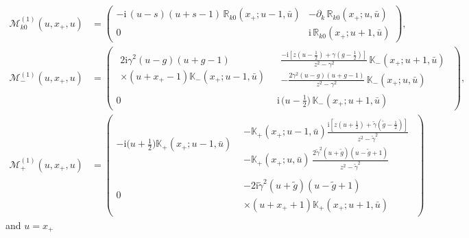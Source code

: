 \documentclass[a4paper,11pt]{article}
\renewcommand{\imath}{\mathrm{i}}
\numberwithin{equation}{section}
\begin{document}
\begin{align}
	\label{Mk01}
	\mathcal{M}^{(1)}_{k0}(u,x_+,u) & =
	\begin{pmatrix}
		-\imath\,(u-s)(u+s-1)\,\mathbb{R}_{k0}(x_+;u-1,\bar{u}) &
		-\partial_k\,\mathbb{R}_{k0}(x_+;u,\bar{u}) \\
		0 & \imath\,\mathbb{R}_{k0}(x_+;u+1,\bar{u})
	\end{pmatrix} , \\
	\label{M-1}
	\mathcal{M}^{(1)}_-(u,x_+,u) & =
	\left(
	\begin{array}{c|c}
		\begin{array}{l}
			2\imath\gamma^2(u-g)(u+g-1) \\
			\times (u+x_+-1)\mathbb{K}_-(x_+;u-1,\bar{u})
		\end{array} &
		\begin{array}{l}
			\frac{-\imath[z(u-\frac{1}{2})+\gamma(g-\frac{1}{2})]}{z^2-\gamma^2}\,\mathbb{K}_-(x_+;u+1,\bar{u}) \\
			-\frac{2\gamma^2(u-g)(u+g-1)}{z^2-\gamma^2}\,\mathbb{K}_-(x_+;u,\bar{u})
		\end{array} \\[12pt]
		\hline
		0 & \imath\,\bigl(u-\frac{1}{2}\bigr)\,\mathbb{K}_-(x_+;u+1,\bar{u})
	\end{array}
	\right) \!, \\
	\label{M+1}
	\mathcal{M}^{(1)}_+(u,x_+,u) & =
	\left(
	\begin{array}{c|c}
		-\imath\bigl(u+\frac{1}{2}\bigr)\mathbb{K}_+(x_+;u-1,\bar{u}) &
		\begin{array}{l}
			-\mathbb{K}_+(x_+;u-1,\bar{u})\frac{\imath[z(u+\frac{1}{2})+\tilde{\gamma}(\tilde{g}-\frac{1}{2})]}{z^2-\tilde{\gamma}^2} \\
			-\mathbb{K}_+(x_+;u,\bar{u})\,\frac{2\tilde{\gamma}^2(u+\tilde{g})(u-\tilde{g}+1)}{z^2-\tilde{\gamma}^2} 
		\end{array} \\[12pt]
		\hline
		0 &
		\begin{array}{l}
			-2\imath\tilde{\gamma}^2(u+\tilde{g})(u-\tilde{g}+1) \\
			\times (u+x_++1) \mathbb{K}_+(x_+;u+1,\bar{u})
		\end{array}
	\end{array}
	\right)
\end{align}
and $u=x_+$
\end{document}
